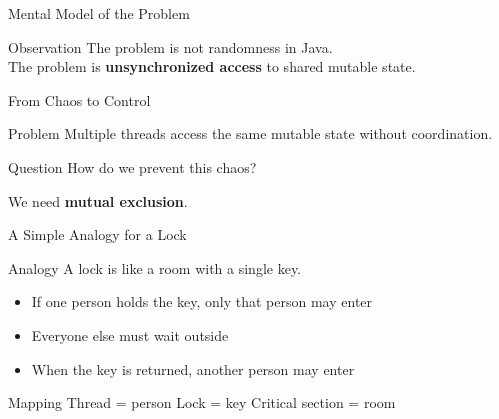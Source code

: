 \documentclass[aspectratio=169,11pt]{beamer}
\begin{document}
\begin{frame}{Mental Model of the Problem}
\begin{center}
\begin{tikzpicture}
			\end{tikzpicture}
		\end{center}
		
		\vspace{0.2cm}
		\begin{block}{Observation}
			The problem is not randomness in Java.\\
			The problem is \textbf{unsynchronized access} to shared mutable state.
		\end{block}
		
	\end{frame}
	
	\begin{frame}{From Chaos to Control}
		\begin{block}{Problem}
			Multiple threads access the same mutable state without coordination.
		\end{block}
		
		\vspace{0.3cm}
		\begin{alertblock}{Question}
			How do we prevent this chaos?
		\end{alertblock}
		
		\vspace{0.3cm}
		\centering
		\Large We need \textbf{mutual exclusion}.
	\end{frame}
	
	\begin{frame}{A Simple Analogy for a Lock}
		\begin{block}{Analogy}
			A lock is like a room with a single key.
		\end{block}
		
		\begin{itemize}
			\item If one person holds the key, only that person may enter
			\item Everyone else must wait outside
			\item When the key is returned, another person may enter
		\end{itemize}
		
		\vspace{0.3cm}
		\begin{alertblock}{Mapping}
			Thread = person \hspace{0.5cm}
			Lock = key \hspace{0.5cm}
			Critical section = room
		\end{alertblock}
	\end{frame}
	
\end{document}
